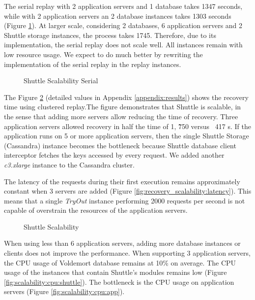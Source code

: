 The serial replay with 2 application servers and 1 database takes 1347 seconds, while with 2 application servers an 2 database instances takes 1303 seconds (Figure \ref{fig:scalability:serial}). At larger scale, considering 2 databases, 6 application servers and 2 Shuttle storage instances, the process takes 1745\ms. Therefore, due to its implementation, the serial replay does not scale well. All instances remain with low resource usage. We expect to do much better by rewriting the implementation of the serial replay in the replay instances.

\begin{figure}[!htb] 
    \centering
    \resizebox{0.5\linewidth}{!}{}
    \caption{Shuttle Scalability Serial}
    \label{fig:scalability:serial}
\end{figure}


The Figure \ref{fig:scalability} (detailed values in Appendix \ref{appendix:results}) shows the recovery time using clustered replay.The figure demonstrates that Shuttle is scalable, in the sense that adding more servers allow reducing the time of recovery. Three application servers allowed recovery in half the time of 1, \~750 versus ~417 s. If the application runs on 5 or more application servers, then the single Shuttle Storage (Cassandra) instance becomes the bottleneck because Shuttle database client interceptor fetches the keys accessed by every request. We added another \emph{c3.xlarge} instance to the Cassandra cluster. 

The latency of the requests during their first execution remains approximately constant when 3 servers are added (Figure \ref{fig:recovery_scalability:latency}). This means that a single \emph{TryOut} instance performing 2000 requests per second is not capable of overstrain the resources of the application servers.

\begin{figure}[!htb]
  \centering
  \caption{Shuttle Scalability}
  \label{fig:scalability}
\end{figure}

When using less than 6 application servers, adding more database instances or clients does not improve the performance.  When supporting 3 application servers, the \ac{CPU} usage of Voldemort database remains at 10\% on average. The \ac{CPU} usage of the instances that contain Shuttle's modules remains low (Figure \ref{fig:scalability:cpu:shuttle}). The bottleneck is the \ac{CPU} usage on application servers (Figure \ref{fig:scalability:cpu:app}).

